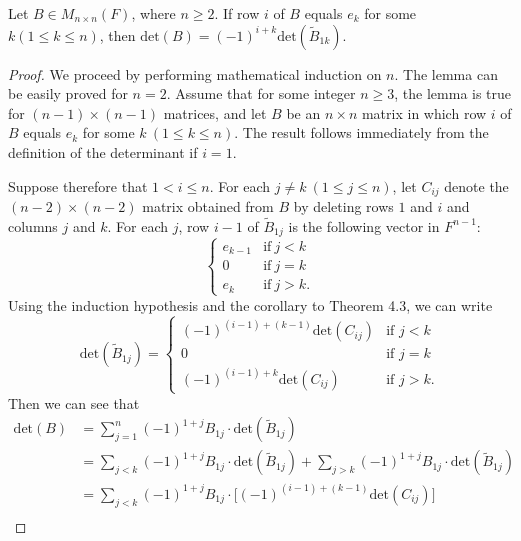 \begin{lemma}
    Let \( B \in {M}_{n \times n}(F)  \), where \( n \geq 2 \). If row \( i  \) of \( B  \) equals \( {e}_{k } \) for some \( k (1 \leq k \leq n) \), then \( \text{det}(B) = (-1)^{i+k } \text{det}({\tilde{B}}_{1k }) \).
\end{lemma}
\begin{proof}
We proceed by performing mathematical induction on \( n  \). The lemma can be easily proved for \( n = 2  \). Assume that for some integer \( n \geq 3  \), the lemma is true for \( (n-1) \times (n-1) \) matrices, and let \( B  \) be an \( n \times n  \) matrix in which row \( i  \) of \( B  \) equals \( {e}_{k}  \) for some \(  k \  (1 \leq k \leq n) \). The result follows immediately from the definition of the determinant if \( i =1  \).


    Suppose therefore that \( 1 < i \leq  n \). For each \( j \neq k  \ (1 \leq j \leq n )\), let \( {C}_{ij} \) denote the \( (n-2) \times (n-2) \) matrix obtained from \( B  \) by deleting rows \( 1  \) and \( i  \) and columns \( j  \) and \( k  \). For each \( j \), row \( i - 1  \) of \( {\tilde{B}}_{1j} \) is the following vector in \( F^{n-1} \):
    \[  
    \begin{cases}
        {e}_{k-1}  &\text{if} \ j < k \\ 
        0  &\text{if} \  j = k \\
        {e}_{k}  &\text{if} \ j > k. 
    \end{cases} \]
    Using the induction hypothesis and the corollary to Theorem 4.3, we can write
    \[  \text{det}({\tilde{B}}_{1j}) = 
    \begin{cases}
        (-1)^{(i-1) + (k-1)} \text{det}({C}_{ij}) &\text{if } j < k \\ 
        0  &\text{if } j = k \\
        (-1)^{(i-1) + k} \text{det}({C}_{ij}) &\text{if } j > k.
    \end{cases} \]
    Then we can see that
    \begin{align*}
        \text{det}(B) &= \sum_{ j=1 }^{ n } (-1)^{1+j} {B}_{1j} \cdot \text{det}({\tilde{B}}_{1j}) \\
                      &= \sum_{ j < k  }^{  } (-1)^{1+j} {B}_{1j} \cdot \text{det}({\tilde{B}}_{1j}) + \sum_{ j > k  }^{  } (-1)^{1+j} {B}_{1j} \cdot \text{det}({\tilde{B}}_{1j}) \\ 
                      &= \sum_{ j < k  }^{  } (-1)^{1+j} {B}_{1j} \cdot \Big[ (-1)^{(i-1) + (k-1)} \text{det}({C}_{ij})\Big] \\

\end{align*}
\end{proof}
